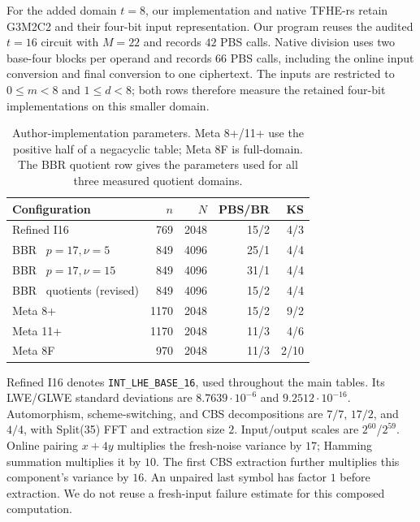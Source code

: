 \documentclass[11pt,a4paper]{article}
\begin{document}
For the added domain $t=8$, our implementation and native TFHE-rs retain G3M2C2 and their four-bit input representation. Our program reuses the audited $t=16$ circuit with $M=22$ and records $42$ PBS calls. Native division uses two base-four blocks per operand and records $66$ PBS calls, including the online input conversion and final conversion to one ciphertext. The inputs are restricted to $0\le m<8$ and $1\le d<8$; both rows therefore measure the retained four-bit implementations on this smaller domain.


\begin{table}[H]
\centering\small
\setlength{\tabcolsep}{5pt}
\caption{Author-implementation parameters. Meta 8+/11+ use the positive half of a negacyclic table; Meta 8F is full-domain. The BBR quotient row gives the parameters used for all three measured quotient domains.}
\label{tab:bbr-meta-parameters}
\begin{tabular}{lrrrr}
\toprule
Configuration & $n$ & $N$ & PBS/BR & KS\\
\midrule
Refined I16~\cite{WHSLCWL25} & 769 & 2048 & 15/2 & 4/3\\
BBR~\cite{BBR26} $p=17,\nu=5$ & 849 & 4096 & 25/1 & 4/4\\
BBR~\cite{BBR26} $p=17,\nu=15$ & 849 & 4096 & 31/1 & 4/4\\
BBR~\cite{BBR26} quotients (revised) & 849 & 4096 & 15/2 & 4/4\\
Meta 8+~\cite{MHWXWW26} & 1170 & 2048 & 15/2 & 9/2\\
Meta 11+~\cite{MHWXWW26} & 1170 & 2048 & 11/3 & 4/6\\
Meta 8F~\cite{MHWXWW26} & 970 & 2048 & 11/3 & 2/10\\
\bottomrule
\end{tabular}
\end{table}

Refined I16 denotes \texttt{INT\_LHE\_BASE\_16}, used throughout the main tables. Its LWE/GLWE standard deviations are $8.7639\cdot10^{-6}$ and $9.2512\cdot10^{-16}$. Automorphism, scheme-switching, and CBS decompositions are $7/7$, $17/2$, and $4/4$, with Split(35) FFT and extraction size $2$. Input/output scales are $2^{60}$/$2^{59}$. Online pairing $x+4y$ multiplies the fresh-noise variance by $17$; Hamming summation multiplies it by $10$. The first CBS extraction further multiplies this component's variance by $16$. An unpaired last symbol has factor $1$ before extraction. We do not reuse a fresh-input failure estimate for this composed computation.
\end{document}
